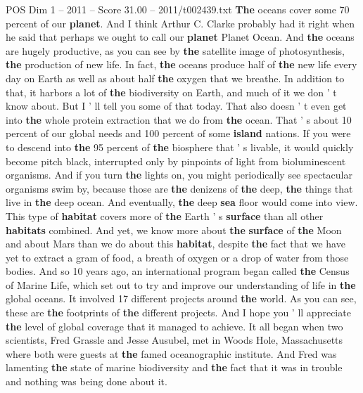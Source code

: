 \begin{textsample}{POS Dim 1 – 2011 – Score 31.00 – 2011/t002439.txt}  \label{ex:f1_pos_032}
\textbf{The} oceans cover some 70 percent of our \textbf{planet}.
And I think Arthur C.
Clarke probably had it right when he said that perhaps we ought to call our \textbf{planet} Planet Ocean.
And \textbf{the} oceans are hugely productive, as you can see by \textbf{the} satellite image of photosynthesis, \textbf{the} production of new life.
In fact, \textbf{the} oceans produce half of \textbf{the} new life every day on Earth as well as about half \textbf{the} oxygen that we breathe.
In addition to that, it harbors a lot of \textbf{the} biodiversity on Earth, and much of it we don ' t know about.
But I ' ll tell you some of that today.
That also doesn ' t even get into \textbf{the} whole protein extraction that we do from \textbf{the} ocean.
That ' s about 10 percent of our global needs and 100 percent of some \textbf{island} nations.
If you were to descend into \textbf{the} 95 percent of \textbf{the} biosphere that ' s livable, it would quickly become pitch black, interrupted only by pinpoints of light from bioluminescent organisms.
And if you turn \textbf{the} lights on, you might periodically see spectacular organisms swim by, because those are \textbf{the} denizens of \textbf{the} deep, \textbf{the} things that live in \textbf{the} deep ocean.
And eventually, \textbf{the} deep \textbf{sea} floor would come into view.
This type of \textbf{habitat} covers more of \textbf{the} Earth ' s \textbf{surface} than all other \textbf{habitats} combined.
And yet, we know more about \textbf{the} \textbf{surface} of \textbf{the} Moon and about Mars than we do about this \textbf{habitat}, despite \textbf{the} fact that we have yet to extract a gram of food, a breath of oxygen or a drop of water from those bodies.
And so 10 years ago, an international program began called \textbf{the} Census of Marine Life, which set out to try and improve our understanding of life in \textbf{the} global oceans.
It involved 17 different projects around \textbf{the} world.
As you can see, these are \textbf{the} footprints of \textbf{the} different projects.
And I hope you ' ll appreciate \textbf{the} level of global coverage that it managed to achieve.
It all began when two scientists, Fred Grassle and Jesse Ausubel, met in Woods Hole, Massachusetts where both were guests at \textbf{the} famed oceanographic institute.
And Fred was lamenting \textbf{the} state of marine biodiversity and \textbf{the} fact that it was in trouble and nothing was being done about it.

\end{textsample}
